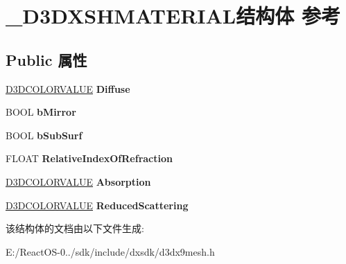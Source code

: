 \hypertarget{struct___d3_d_x_s_h_m_a_t_e_r_i_a_l}{}\section{\+\_\+\+D3\+D\+X\+S\+H\+M\+A\+T\+E\+R\+I\+A\+L结构体 参考}
\label{struct___d3_d_x_s_h_m_a_t_e_r_i_a_l}
\subsection*{Public 属性}
\begin{DoxyCompactItemize}
\item 
\mbox{\label{struct___d3_d_x_s_h_m_a_t_e_r_i_a_l_aeddd6bcabfcf0de6c3b1111a1e72f20f}} 
\hyperlink{struct___d3_d_c_o_l_o_r_v_a_l_u_e}{D3\+D\+C\+O\+L\+O\+R\+V\+A\+L\+UE} {\bfseries Diffuse}
\item 
\mbox{\label{struct___d3_d_x_s_h_m_a_t_e_r_i_a_l_a39105b74d75ce663565c8937e6012231}} 
B\+O\+OL {\bfseries b\+Mirror}
\item 
\mbox{\label{struct___d3_d_x_s_h_m_a_t_e_r_i_a_l_a1d3deb1eae49b721fd45576a65c4142d}} 
B\+O\+OL {\bfseries b\+Sub\+Surf}
\item 
\mbox{\label{struct___d3_d_x_s_h_m_a_t_e_r_i_a_l_add36fab1c67f82e6c5980b15cee8ea47}} 
F\+L\+O\+AT {\bfseries Relative\+Index\+Of\+Refraction}
\item 
\mbox{\label{struct___d3_d_x_s_h_m_a_t_e_r_i_a_l_ac91edbdf964d71d61cb865af87f36e2c}} 
\hyperlink{struct___d3_d_c_o_l_o_r_v_a_l_u_e}{D3\+D\+C\+O\+L\+O\+R\+V\+A\+L\+UE} {\bfseries Absorption}
\item 
\mbox{\label{struct___d3_d_x_s_h_m_a_t_e_r_i_a_l_aa5e765e1838bbf254f8bda4a34e1015c}} 
\hyperlink{struct___d3_d_c_o_l_o_r_v_a_l_u_e}{D3\+D\+C\+O\+L\+O\+R\+V\+A\+L\+UE} {\bfseries Reduced\+Scattering}
\end{DoxyCompactItemize}


该结构体的文档由以下文件生成\+:\begin{DoxyCompactItemize}
\item 
E\+:/\+React\+O\+S-\/0../sdk/include/dxsdk/d3dx9mesh.\+h\end{DoxyCompactItemize}
